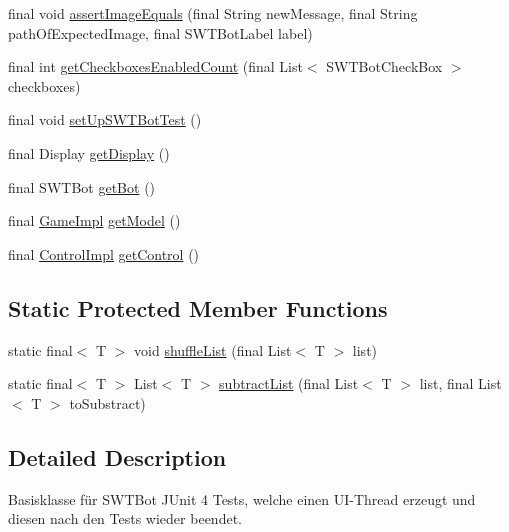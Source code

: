 \begin{DoxyCompactItemize}
\item 
final void \hyperlink{classdominion_1_1view_1_1utils_1_1SWTBotBase_a293ecd3c566e73a54dd50a3ff3e05bdb}{assert\-Image\-Equals} (final \-String new\-Message, final \-String path\-Of\-Expected\-Image, final \-S\-W\-T\-Bot\-Label label)
\item 
final int \hyperlink{classdominion_1_1view_1_1utils_1_1SWTBotBase_aa16b09eb1bcfebfcb6eba7b1197e4b7d}{get\-Checkboxes\-Enabled\-Count} (final \-List$<$ \-S\-W\-T\-Bot\-Check\-Box $>$ checkboxes)
\item 
final void \hyperlink{classdominion_1_1view_1_1utils_1_1SWTBotBase_a20ac330c0ae207755724bf3570659849}{set\-Up\-S\-W\-T\-Bot\-Test} ()
\item 
final \-Display \hyperlink{classdominion_1_1view_1_1utils_1_1SWTBotBase_a9e5c623116bc20b013170856415a1b97}{get\-Display} ()
\item 
final \-S\-W\-T\-Bot \hyperlink{classdominion_1_1view_1_1utils_1_1SWTBotBase_a5ee30772dd887c1a16cfe9da50e4b6e5}{get\-Bot} ()
\item 
final \hyperlink{classdominion_1_1model_1_1GameImpl}{\-Game\-Impl} \hyperlink{classdominion_1_1view_1_1utils_1_1SWTBotBase_a5533d3ac64ce06d47f32b4c5e0be7a80}{get\-Model} ()
\item 
final \hyperlink{classdominion_1_1control_1_1ControlImpl}{\-Control\-Impl} \hyperlink{classdominion_1_1view_1_1utils_1_1SWTBotBase_ad6f9b2a43da96f310fc105ee7023bedc}{get\-Control} ()
\end{DoxyCompactItemize}
\subsection*{\-Static \-Protected \-Member \-Functions}
\begin{DoxyCompactItemize}
\item 
static final$<$ \-T $>$ void \hyperlink{classdominion_1_1view_1_1utils_1_1SWTBotBase_a47ff844235d456d1cda4a303994ca21d}{shuffle\-List} (final \-List$<$ \-T $>$ list)
\item 
static final$<$ \-T $>$ \-List$<$ \-T $>$ \hyperlink{classdominion_1_1view_1_1utils_1_1SWTBotBase_a4b10325dfce627552c166fd254f21a0c}{subtract\-List} (final \-List$<$ \-T $>$ list, final \-List$<$ \-T $>$ to\-Substract)
\end{DoxyCompactItemize}


\subsection{\-Detailed \-Description}
\-Basisklasse für \-S\-W\-T\-Bot \-J\-Unit 4 \-Tests, welche einen \-U\-I-\/\-Thread erzeugt und diesen nach den \-Tests wieder beendet.

